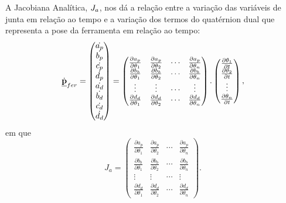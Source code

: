 A Jacobiana Analítica, $J_{a}$, nos dá a relação entre a variação
das variáveis de junta em relação ao tempo e a variação dos termos
do quatérnion dual que representa a pose da ferramenta em relação
ao tempo:
\begin{equation}
\dot{\underline{\mathbf{p}}}_{fer}=\begin{pmatrix}\dot{a_{p}}\\
\dot{b_{p}}\\
\dot{c_{p}}\\
\dot{d_{p}}\\
\dot{a_{d}}\\
\dot{b_{d}}\\
\dot{c_{d}}\\
\dot{d_{d}}
\end{pmatrix}=\begin{pmatrix}\frac{\partial a_{p}}{\partial\theta_{1}} & \frac{\partial a_{p}}{\partial\theta_{2}} & \cdots & \frac{\partial a_{p}}{\partial\theta_{n}}\\
\frac{\partial b_{b}}{\partial\theta_{1}} & \frac{\partial b_{b}}{\partial\theta_{2}} & \cdots & \frac{\partial b_{b}}{\partial\theta_{n}}\\
\vdots & \vdots & \cdots & \vdots\\
\frac{\partial d_{d}}{\partial\theta_{1}} & \frac{\partial d_{d}}{\partial\theta_{2}} & \cdots & \frac{\partial d_{d}}{\partial\theta_{n}}
\end{pmatrix}.\begin{pmatrix}\frac{\partial\theta_{1}}{\partial t}\\
\frac{\partial\theta_{2}}{\partial t}\\
\vdots\\
\frac{\partial\theta_{n}}{\partial t}
\end{pmatrix},
\end{equation}
em que 
\begin{equation}
J_{a}=\begin{pmatrix}\frac{\partial a_{p}}{\partial\theta_{1}} & \frac{\partial a_{p}}{\partial\theta_{2}} & \cdots & \frac{\partial a_{p}}{\partial\theta_{n}}\\
\frac{\partial b_{b}}{\partial\theta_{1}} & \frac{\partial b_{b}}{\partial\theta_{2}} & \cdots & \frac{\partial b_{b}}{\partial\theta_{n}}\\
\vdots & \vdots & \cdots & \vdots\\
\frac{\partial d_{d}}{\partial\theta_{1}} & \frac{\partial d_{d}}{\partial\theta_{2}} & \cdots & \frac{\partial d_{d}}{\partial\theta_{n}}
\end{pmatrix}.
\end{equation}


